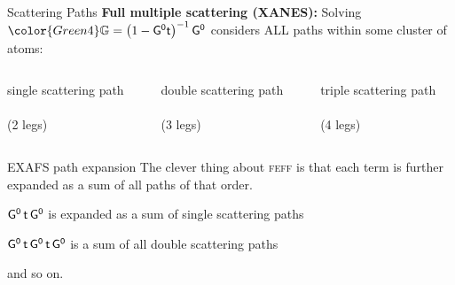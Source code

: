 \begin{frame}{Scattering Paths}
  \textbf{Full multiple scattering (XANES):} Solving {\color{DarkOrchid4}
    ${\color{Green4}\GMS} = \big(1 - \Gnot \tmat\big)^{-1} \, \Gnot$}
  considers {\LARGE ALL} paths within some cluster of atoms:
  \begin{columns}[T]
    \begin{column}{0.33\linewidth}
      \begin{center}
        {\color{DarkOrchid4}single scattering path}\\
        {\color{blue}\SS}\\
        (2 legs)
      \end{center}
    \end{column}
    \begin{column}{0.33\linewidth}
      \begin{center}
        {\color{DarkOrchid4}double scattering path}\\
        {\color{blue}\FDS}\\
        (3 legs)
      \end{center}
    \end{column}
    \begin{column}{0.33\linewidth}
      \begin{center}
        {\color{DarkOrchid4}triple scattering path}\\
        {\color{blue}\FTS}\\
        (4 legs)
      \end{center}
    \end{column}
  \end{columns}

  \medskip

  \begin{exampleblock}{EXAFS path expansion}
    The clever thing about \textsc{feff} is that each term is further
    expanded as a sum of all paths of that order.

    \medskip

    {\color{DarkOrchid4}$\mathsf{G^0}\,\mathsf{t}\,\mathsf{G^0}$} is expanded as a sum of
    {\color{DarkOrchid4}single scattering} paths

    \medskip

    {\color{DarkOrchid4}$\mathsf{G^0}\,\mathsf{t}\,\mathsf{G^0}\,\mathsf{t}\,\mathsf{G^0}$} is a sum
    of all {\color{DarkOrchid4}double scattering} paths

    \medskip

    and so on.
  \end{exampleblock}

\end{frame}
